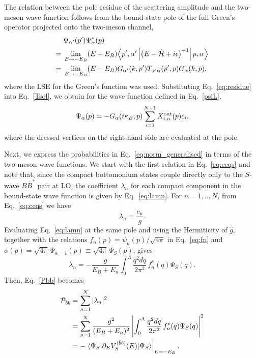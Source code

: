 \documentclass[aps,prd,showpacs,amsmath,twocolumn,superscriptaddress,floatfix,nofootinbib,notitlepage]{revtex4-2}
\newcommand{\be}{\begin{equation}}
\newcommand{\ee}{\end{equation}}
\newcommand{\dqr}{\frac{q^2dq}{2\pi^2}}
\newcommand{\tilH}{\tilde{{\cal H}}}
\begin{document}
The relation between the pole residue of the scattering amplitude and the two-meson wave function follows from the bound-state pole of the full Green's operator projected onto the two-meson channel,
\begin{align}
&\Psi_{\alpha'}(p')\Psi_\alpha^*(p)\notag\\
={}&
\lim_{E\to-E_B}(E+E_B)
\Big\langle p',\alpha'\left|
\bigl(E-\tilH+i\epsilon\bigr)^{-1}
\right|p,\alpha\Big\rangle
\notag\\
={}&
\lim_{E\to-E_B}(E+E_B)
G_{\alpha'}(k,p')T_{\alpha'\alpha}(p',p)G_\alpha(k,p),
\end{align}
where the LSE for the Green's function was used.
Substituting Eq.~\eqref{eq:residue} into Eq.~\eqref{Tsol}, we obtain for the wave function defined in Eq.~\eqref{psiL},
\be
\Psi_\alpha(p)=-G_\alpha(i\kappa_B,p)
\sum_{i=1}^{N+1}X^{\rm out}_{i,\alpha}(p)c_i,
\label{eq:wf}
\ee
where the dressed vertices on the right-hand side are evaluated at the pole.

Next, we express the probabilities in Eq.~\eqref{eq:norm_generalised} in terms of the two-meson wave functions.
We start with the first relation in Eq.~\eqref{eq:ceqs} and note that,
since the compact bottomonium states couple directly only to the $S$-wave $B\bar{B}^*$ pair at LO, the coefficient $\lambda_n$ for each compact component in the bound-state wave function is given by Eq.~\eqref{eq:lamn}. For $n=1,..,N$, from Eq.~\eqref{eq:ceqs} we have
\be
\lambda_n=\frac{c_n}{g}.
\ee
Evaluating Eq.~\eqref{eq:lamn} at the same pole and using the Hermiticity of $\hat g$, together with the relations $f_n(p)=\psi_n(p)/\sqrt{4\pi}$ in Eq.~\eqref{eq:fn} and $\phi(p)=\sqrt{4\pi}\,\Psi_{\alpha=1}(p)\equiv\sqrt{4\pi}\,\Psi_S(p)$, gives
\be
\lambda_n =-\frac{g}{E_B+E_n}
\int_0^\Lambda\dqr\,f_n^*(q)\Psi_S(q).
\label{eq:compact-amplitudes}
\ee
Then, Eq.~\eqref{Pbb} becomes
\be
\begin{split}
{\cal P}_{\bar{b}b}
&=\sum_{n=1}^N|\lambda_n|^2\\
&=\sum_{n=1}^N\frac{g^2}{(E_B+E_n)^2}
\left|\int_0^\Lambda\dqr\,f_n^*(q)\Psi_S(q)\right|^2\\
&=-\left.
\braket{\Psi_S|\partial_E V_S^{(\bar{b} b)}(E)|\Psi_S}
\right|_{E=-E_B}.
\end{split}
\label{eq:P-bbbar}
\ee
\end{document}

